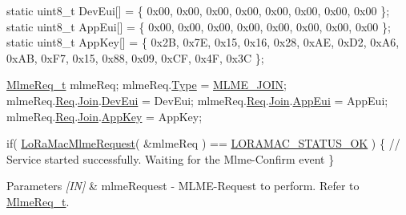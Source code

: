 \begin{DoxyCode}
\textcolor{keyword}{static} uint8\_t DevEui[] =
\{
  0x00, 0x00, 0x00, 0x00, 0x00, 0x00, 0x00, 0x00
\};
\textcolor{keyword}{static} uint8\_t AppEui[] =
\{
  0x00, 0x00, 0x00, 0x00, 0x00, 0x00, 0x00, 0x00
\};
\textcolor{keyword}{static} uint8\_t AppKey[] =
\{
  0x2B, 0x7E, 0x15, 0x16, 0x28, 0xAE, 0xD2, 0xA6,
  0xAB, 0xF7, 0x15, 0x88, 0x09, 0xCF, 0x4F, 0x3C
\};

\hyperlink{structsMlmeReq}{MlmeReq\_t} mlmeReq;
mlmeReq.\hyperlink{structsMlmeReq_ab7870d559ad9c5a08d305220bf798cd3}{Type} = \hyperlink{group__LORAMAC_gga320f4c08fe99747b08463689be624f7ba475ad5dea1c4c13b93b31095c665e92e}{MLME\_JOIN};
mlmeReq.\hyperlink{structsMlmeReq_a6f57f62db1981b24980a7745b966a469}{Req}.\hyperlink{unionsMlmeReq_1_1uMlmeParam_a8065a3a3d703e59ee8ee10ed48bcb726}{Join}.\hyperlink{structsMlmeReqJoin_abd56390965a0e3a80e198d9ae39d1625}{DevEui} = DevEui;
mlmeReq.\hyperlink{structsMlmeReq_a6f57f62db1981b24980a7745b966a469}{Req}.\hyperlink{unionsMlmeReq_1_1uMlmeParam_a8065a3a3d703e59ee8ee10ed48bcb726}{Join}.\hyperlink{structsMlmeReqJoin_a46bda1421b6d9dc9e6444ece02fd77d0}{AppEui} = AppEui;
mlmeReq.\hyperlink{structsMlmeReq_a6f57f62db1981b24980a7745b966a469}{Req}.\hyperlink{unionsMlmeReq_1_1uMlmeParam_a8065a3a3d703e59ee8ee10ed48bcb726}{Join}.\hyperlink{structsMlmeReqJoin_a3bd1a01c6d01990265ec2b5bf0dd906f}{AppKey} = AppKey;

\textcolor{keywordflow}{if}( \hyperlink{group__LORAMAC_ga097113f30feecc17c780940ff74af33e}{LoRaMacMlmeRequest}( &mlmeReq ) == \hyperlink{group__LORAMAC_gga1d18f26b344040b3ec5c3db662919661a03db5fca052313edb3823c014b653a74}{LORAMAC\_STATUS\_OK} )
\{
  \textcolor{comment}{// Service started successfully. Waiting for the Mlme-Confirm event}
\}
\end{DoxyCode}



\begin{DoxyParams}{Parameters}
{\em \mbox{[}\+I\+N\mbox{]}} & mlme\+Request -\/ M\+L\+M\+E-\/\+Request to perform. Refer to \hyperlink{group__LORAMAC_ga5a32f5920a7a3d04435c142be7f38b19}{Mlme\+Req\+\_\+t}.\\
\hline
\end{DoxyParams}

